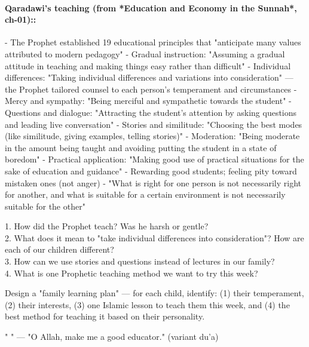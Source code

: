 \documentclass[11pt,a4paper]{article}
\begin{document}
\paragraph*{Qaradawi's teaching (from *Education and Economy in the Sunnah*, ch-01)::}  - The Prophet established 19 educational principles that "anticipate many values attributed to modern pedagogy" - Gradual instruction: "Assuming a gradual attitude in teaching and making things easy rather than difficult" - Individual differences: "Taking individual differences and variations into consideration" --- the Prophet tailored counsel to each person's temperament and circumstances - Mercy and sympathy: "Being merciful and sympathetic towards the student" - Questions and dialogue: "Attracting the student's attention by asking questions and leading live conversation" - Stories and similitude: "Choosing the best modes (like similitude, giving examples, telling stories)" - Moderation: "Being moderate in the amount being taught and avoiding putting the student in a state of boredom" - Practical application: "Making good use of practical situations for the sake of education and guidance" - Rewarding good students; feeling pity toward mistaken ones (not anger) - "What is right for one person is not necessarily right for another, and what is suitable for a certain environment is not necessarily suitable for the other"

\begin{discussionbox} 1. How did the Prophet teach? Was he harsh or gentle? \\ 2. What does it mean to "take individual differences into consideration"? How are each of our children different? \\ 3. How can we use stories and questions instead of lectures in our family? \\ 4. What is one Prophetic teaching method we want to try this week? \end{discussionbox}

\begin{activitybox} Design a "family learning plan" --- for each child, identify: (1) their temperament, (2) their interests, (3) one Islamic lesson to teach them this week, and (4) the best method for teaching it based on their personality. \end{activitybox}

\begin{duabox} "   " --- "O Allah, make me a good educator." (variant du'a) \end{duabox}
\end{document}

